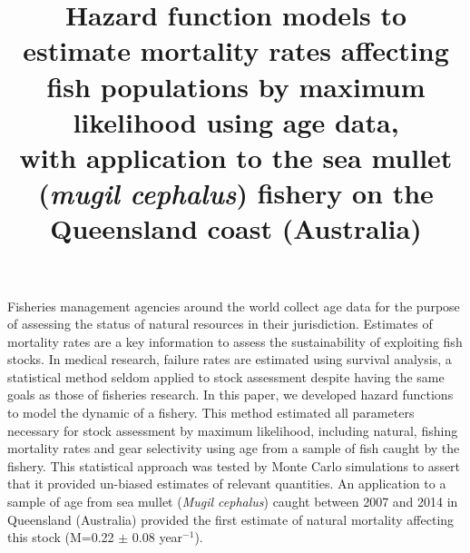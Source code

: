 \documentclass[12pt]{article}
\begin{document}

\setlength{\textheight}{575pt}
\setlength{\baselineskip}{23pt}


\title{Hazard function models to estimate mortality rates affecting fish populations by maximum likelihood using age data,\\ with application to the sea mullet ({\it mugil cephalus}) fishery on the Queensland coast (Australia)}







\maketitle

\begin{summary}
Fisheries management agencies around the world collect age data for the purpose of assessing the status of natural resources in their jurisdiction. Estimates of mortality rates are a key information to assess the sustainability of exploiting fish stocks. In medical research, failure rates are estimated using survival analysis, a statistical method seldom applied to stock assessment despite having the same goals as those of fisheries research. In this paper, we developed hazard functions to model the dynamic of a fishery. This method estimated all parameters necessary for stock assessment by maximum likelihood, including natural, fishing mortality rates and gear selectivity using age from a sample of fish caught by the fishery. This statistical approach was tested by Monte Carlo simulations to assert that it provided un-biased estimates of relevant quantities. An application to a sample of age from sea mullet ({\it Mugil cephalus}) caught between 2007 and 2014 in Queensland (Australia) provided the first estimate of natural mortality affecting this stock (M=0.22 $\pm$ 0.08 year$^{-1}$).
\end{summary}
\end{document}
